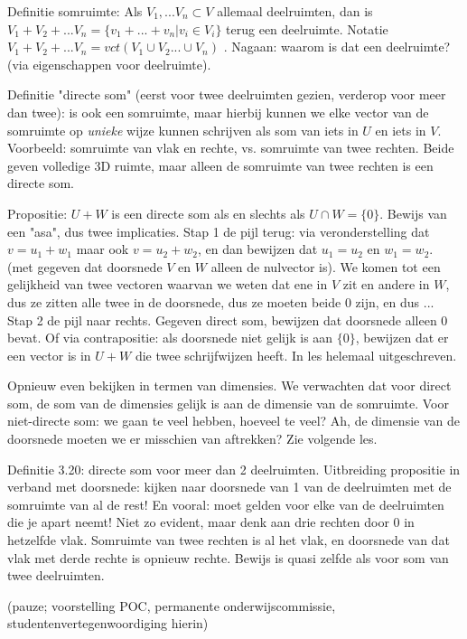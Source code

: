 \documentclass{article}
\begin{document}
Definitie somruimte: Als $V_1, ... V_n \subset V$ allemaal deelruimten, dan is $V_1 + V_2 + ... V_n = \{ v_1 + ... + v_n | v_i \in V_i \}$  terug een deelruimte. Notatie $V_1 + V_2 + ... V_n = vct(V_1 \cup V_2 ... \cup V_n)$ . Nagaan: waarom is dat een deelruimte? (via eigenschappen voor deelruimte). 

Definitie "directe som" (eerst voor twee deelruimten gezien, verderop voor meer dan twee): is ook een somruimte, maar hierbij kunnen we elke vector van de somruimte op \emph{unieke} wijze kunnen schrijven als som van iets in $U$ en iets in $V$. Voorbeeld: somruimte van vlak en rechte, vs. somruimte van twee rechten. Beide geven volledige 3D ruimte, maar alleen de somruimte van twee rechten is een directe som. 

Propositie: $U+W$ is een directe som als en slechts als $U \cap W = \{ 0 \} $. Bewijs van een "asa", dus twee implicaties. Stap 1 de pijl terug: via veronderstelling dat $v=u_1 + w_1$ maar ook $v=u_2 + w_2$, en dan bewijzen dat $u_1=u_2$ en $w_1=w_2$. (met gegeven dat doorsnede $V$ en $W$ alleen de nulvector is). We komen tot een gelijkheid van twee vectoren waarvan we weten dat ene in $V$ zit en andere in $W$, dus ze zitten alle twee in de doorsnede, dus ze moeten beide $0$ zijn, en dus ... 
Stap 2 de pijl naar rechts. Gegeven direct som, bewijzen dat doorsnede alleen $0$ bevat. Of via contrapositie: als doorsnede niet gelijk is aan $\{ 0 \} $, bewijzen dat er een vector is in $U+W$ die twee schrijfwijzen heeft. In les helemaal uitgeschreven. 

Opnieuw even bekijken in termen van dimensies. We verwachten dat voor direct som, de som van de dimensies gelijk is aan de dimensie van de somruimte. Voor niet-directe som: we gaan te veel hebben, hoeveel te veel? Ah, de dimensie van de doorsnede moeten we er misschien van aftrekken? Zie volgende les. 

Definitie 3.20: directe som voor meer dan 2 deelruimten. Uitbreiding propositie in verband met doorsnede: kijken naar doorsnede van 1 van de deelruimten met de somruimte van al de rest! En vooral: moet gelden voor elke van de deelruimten die je apart neemt! 
Niet zo evident, maar denk aan drie rechten door 0 in hetzelfde vlak. Somruimte van twee rechten is al het vlak, en doorsnede van dat vlak met derde rechte is opnieuw rechte. Bewijs is quasi zelfde als voor som van twee deelruimten. 

(pauze; voorstelling POC, permanente onderwijscommissie, studentenvertegenwoordiging hierin) 
\end{document}

